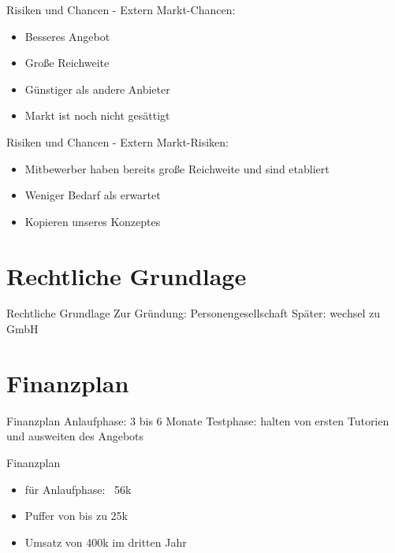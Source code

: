 \begin{frame}[c]{Risiken und Chancen - Extern}
    \Large
    Markt-Chancen:
    \begin{itemize}[<+(1)->]
    \item Besseres Angebot
    \item Große Reichweite
    \item Günstiger als andere Anbieter
    \item Markt ist noch nicht gesättigt
    \end{itemize}
\end{frame}


\begin{frame}[c]{Risiken und Chancen - Extern}
    \Large
    Markt-Risiken:
    \begin{itemize}[<+(1)->]
    \item Mitbewerber haben bereits große Reichweite und sind etabliert
    \item Weniger Bedarf als erwartet
    \item Kopieren unseres Konzeptes
    \end{itemize}
\end{frame}


\section{Rechtliche Grundlage}

\begin{frame}[c]{Rechtliche Grundlage}
    \Large
    \pause
    Zur Gründung: Personengesellschaft
    \newline
    \newline
    \pause
    Später: wechsel zu GmbH
\end{frame}


\section{Finanzplan}

\begin{frame}[c]{Finanzplan}
    \Large
    Anlaufphase: 3 bis 6 Monate
    \pause
    \newline
    Testphase: halten von ersten Tutorien und ausweiten des Angebots
\end{frame}


\begin{frame}[c]{Finanzplan}
    \Large
    \begin{itemize}[<+(1)->]
    \item für Anlaufphase: ~56k
    \item Puffer von bis zu 25k
    \item Umsatz von 400k im dritten Jahr
    \end{itemize}
\end{frame}


